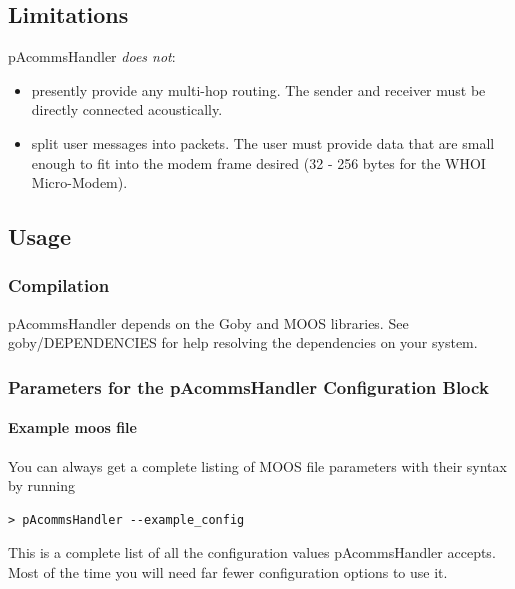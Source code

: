 \documentclass[11pt, letterpaper, oneside]{memoir}
\begin{document}
\subsection{Limitations}
pAcommsHandler \textit{does not}:

\begin{itemize}
\item presently provide any multi-hop routing. The sender and receiver must be directly connected acoustically.
\item split user messages into packets. The user must provide data that are small enough to fit into the modem frame desired (32 - 256 bytes for the WHOI Micro-Modem).
\end{itemize} 

\subsection{Usage}
\subsubsection{Compilation}
pAcommsHandler depends on the Goby and MOOS libraries. See goby/DEPENDENCIES for help resolving the dependencies on your system.

\subsubsection{Parameters for the pAcommsHandler Configuration Block}\label{sec:pAcommsHandler:config}

\paragraph{Example moos file}

You can always get a complete listing of MOOS file parameters with their syntax by running
\begin{verbatim}
> pAcommsHandler --example_config
\end{verbatim}
\resetbvlinenumber

This is a complete list of all the configuration values pAcommsHandler accepts. Most of the time you will need far fewer configuration options to use it.
\end{document}
